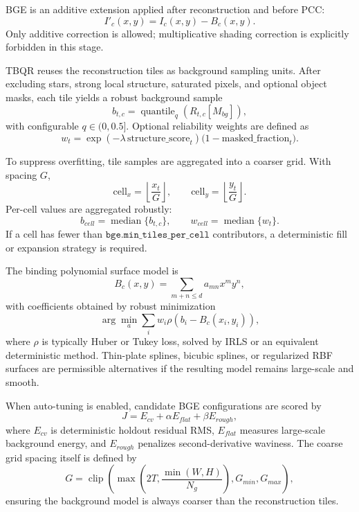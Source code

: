 \documentclass[10pt,twocolumn]{article}
\begin{document}
BGE is an additive extension applied after reconstruction and before PCC:
\begin{equation}
  I'_c(x,y) = I_c(x,y) - B_c(x,y).
\end{equation}
Only additive correction is allowed; multiplicative shading correction is explicitly forbidden in this stage.

TBQR reuses the reconstruction tiles as background sampling units. After excluding stars, strong local structure, saturated pixels, and optional object masks, each tile yields a robust background sample
\begin{equation}
  b_{t,c} = \operatorname{quantile}_q(R_{t,c}[M_{bg}]),
\end{equation}
with configurable $q \in (0,0.5]$. Optional reliability weights are defined as
\begin{equation}
  w_t =
  \exp(-\lambda \, \mathrm{structure\_score}_t)
  \bigl(1-\mathrm{masked\_fraction}_t\bigr).
\end{equation}

To suppress overfitting, tile samples are aggregated into a coarser grid. With spacing $G$,
\begin{equation}
  \mathrm{cell}_x = \left\lfloor \frac{x_t}{G} \right\rfloor,
  \qquad
  \mathrm{cell}_y = \left\lfloor \frac{y_t}{G} \right\rfloor.
\end{equation}
Per-cell values are aggregated robustly:
\begin{equation}
  b_{cell} = \operatorname{median}\{b_{t,c}\},
  \qquad
  w_{cell} = \operatorname{median}\{w_t\}.
\end{equation}
If a cell has fewer than $\texttt{bge.min\_tiles\_per\_cell}$ contributors, a deterministic fill or expansion strategy is required.

The binding polynomial surface model is
\begin{equation}
  B_c(x,y) = \sum_{m+n \le d} a_{mn}x^my^n,
\end{equation}
with coefficients obtained by robust minimization
\begin{equation}
  \arg\min_a \sum_i w_i \rho\!\left(b_i - B_c(x_i,y_i)\right),
\end{equation}
where $\rho$ is typically Huber or Tukey loss, solved by IRLS or an equivalent deterministic method. Thin-plate splines, bicubic splines, or regularized RBF surfaces are permissible alternatives if the resulting model remains large-scale and smooth.

When auto-tuning is enabled, candidate BGE configurations are scored by
\begin{equation}
  J = E_{cv} + \alpha E_{flat} + \beta E_{rough},
\end{equation}
where $E_{cv}$ is deterministic holdout residual RMS, $E_{flat}$ measures large-scale background energy, and $E_{rough}$ penalizes second-derivative waviness. The coarse grid spacing itself is defined by
\begin{equation}
  G = \operatorname{clip}\!\left(\max\!\left(2T,\frac{\min(W,H)}{N_g}\right), G_{min}, G_{max}\right),
\end{equation}
ensuring the background model is always coarser than the reconstruction tiles.
\end{document}
